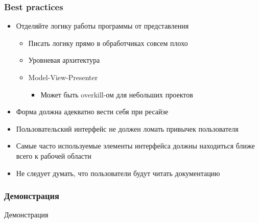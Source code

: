 \documentclass[xetex,mathserif,serif]{beamer}
\begin{document}
	\begin{frame}
		\frametitle{Best practices}
		\begin{itemize}
			\item Отделяйте логику работы программы от представления
			\begin{itemize}
				\item Писать логику прямо в обработчиках совсем плохо
				\item Уровневая архитектура
				\item Model-View-Presenter
				\begin{itemize}
					\item Может быть overkill-ом для небольших проектов
				\end{itemize}
			\end{itemize}
			\item Форма должна адекватно вести себя при ресайзе
			\item Пользовательский интерфейс не должен ломать привычек пользователя
			\item Самые часто используемые элементы интерфейса должны находиться ближе всего к рабочей области
			\item Не следует думать, что пользователи будут читать документацию
		\end{itemize}
	\end{frame}

	\begin{frame}
		\frametitle{Демонстрация}
		\begin{Huge}\begin{center}Демонстрация\end{center}\end{Huge}
	\end{frame}
\end{document}
